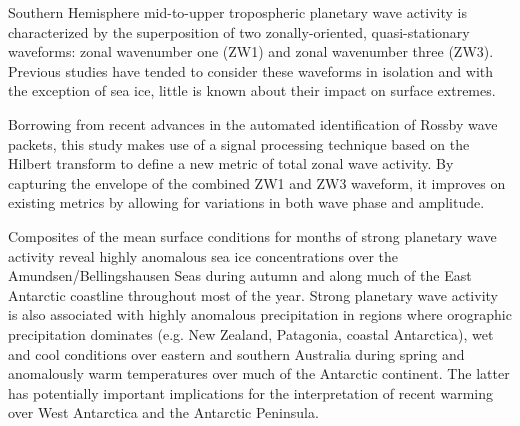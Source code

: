 Southern Hemisphere mid-to-upper tropospheric planetary wave activity is characterized by the superposition of two zonally-oriented, quasi-stationary waveforms: zonal wavenumber one (ZW1) and zonal wavenumber three (ZW3). Previous studies have tended to consider these waveforms in isolation and with the exception of sea ice, little is known about their impact on surface extremes. 

Borrowing from recent advances in the automated identification of Rossby wave packets, this study makes use of a signal processing technique based on the Hilbert transform to define a new metric of total zonal wave activity. By capturing the envelope of the combined ZW1 and ZW3 waveform, it improves on existing metrics by allowing for variations in both wave phase and amplitude.

Composites of the mean surface conditions for months of strong planetary wave activity reveal highly anomalous sea ice concentrations over the Amundsen/Bellingshausen Seas during autumn and along much of the East Antarctic coastline throughout most of the year. Strong planetary wave activity is also associated with highly anomalous precipitation in regions where orographic precipitation dominates (e.g. New Zealand, Patagonia, coastal Antarctica), wet and cool conditions over eastern and southern Australia during spring and anomalously warm temperatures over much of the Antarctic continent. The latter has potentially important implications for the interpretation of recent warming over West Antarctica and the Antarctic Peninsula.
